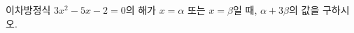 이차방정식 $3x^2-5x-2=0$의 해가 $x=\alpha$ 또는 $x=\beta$일 때, $\alpha+3\beta$의 값을 구하시오. \cond{$\alpha>\beta$}
